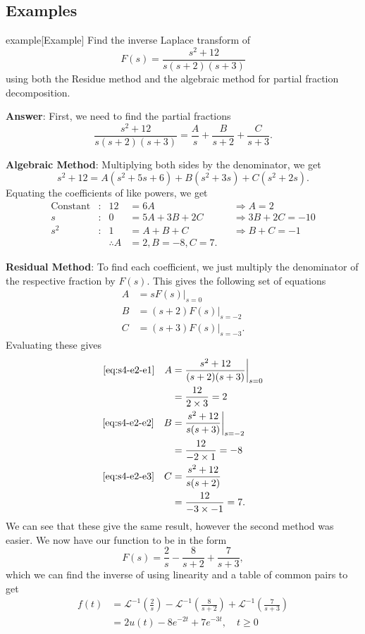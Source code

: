 \documentclass{article}
\begin{document}
\subsection{Examples}
\begin{callout}{example}[Example]
\label{example:s4-e2}
Find the inverse Laplace transform of
\[
    F(s)=\frac{s^2+12}{s(s+2)(s+3)}
\]
using both the Residue method and the algebraic method for partial fraction decomposition.

\textbf{Answer}: First, we need to find the partial fractions
\[
    \frac{s^2+12}{s(s+2)(s+3)}=\frac{A}{s}+\frac{B}{s+2}+\frac{C}{s+3}.
\]

\textbf{Algebraic Method}:
Multiplying both sides by the denominator, we get
\[
    s^2+12=A(s^2+5s+6)+B(s^2+3s)+C(s^2+2s).
\]
Equating the coefficients of like powers, we get
\begin{align*}
    \text{Constant}&:& 12&=6A& &\Rightarrow A=2 \\
    s&:             & 0&=5A+3B+2C& &\Rightarrow 3B+2C=-10 \\
    s^2&:           & 1&=A+B+C& &\Rightarrow B+C=-1 \\
       & & \therefore A&=2,B=-8,C=7.
\end{align*}

\textbf{Residual Method}:
To find each coefficient, we just multiply the denominator of the respective fraction by $F(s)$. This gives the following set of equations
\begin{align}
    A &= sF(s)\bigg\rvert_{s=0}\label{eq:s4-e2-e1}
 \\
    B&= (s+2)F(s)\bigg\rvert_{s=-2}\label{eq:s4-e2-e2}
 \\
C&= (s+3)F(s)\bigg\rvert_{s=-3}. \label{eq:s4-e2-e3}
\end{align}
Evaluating these gives
\begin{align*}
    \eqref{eq:s4-e2-e1}\quad A &= \frac{s^2+12}{(s+2)(s+3)}\bigg\rvert_{s=0} \\
                               &= \frac{12}{2\times 3} =2\\
    \eqref{eq:s4-e2-e2}\quad B&= \frac{s^2+12}{s(s+3)}\bigg\rvert_{s=-2}\\
                              &= \frac{12}{-2\times 1} = -8 \\
    \eqref{eq:s4-e2-e3}\quad C&= \frac{s^2+12}{s(s+2)} \\
                              &= \frac{12}{-3\times -1} = 7.
\end{align*}
We can see that these give the same result, however the second method was easier. We now have our function to be in the form
\[
    F(s)=\frac{2}{s}-\frac{8}{s+2}+\frac{7}{s+3},
\]
which we can find the inverse of using linearity and a table of common pairs to get
\begin{align*}
    f(t)&=\mathcal{L}^{-1}\left( \frac{2}{s} \right)-\mathcal{L}^{-1}\left( \frac{8}{s+2} \right)+\mathcal{L}^{-1}\left( \frac{7}{s+3} \right) \\
        &= 2u(t)-8e^{-2t}+7e^{-3t},\quad t\geq 0
\end{align*}
\end{callout}
\end{document}
